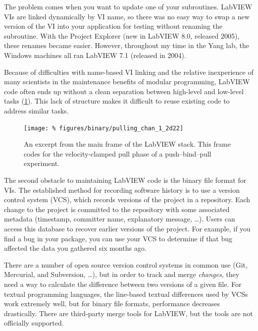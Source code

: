 
The problem comes when you want to update one of your subroutines.
LabVIEW VIs are linked dynamically by VI name\citep{ni-vi-management},
so there was no easy way to swap a new version of the VI into your
application for testing without renaming the subroutine.  With the
Project Explorer (new in LabVIEW 8.0\citep{ni-vi-management}, released
2005), these renames became easier.  However, throughout my time in
the Yang lab, the Windows machines all ran LabVIEW 7.1 (released in
2004).

Because of difficulties with name-based VI linking and the relative
inexperience of many scientists in the maintenance benefits of modular
programming\citep{hilburn93,wilson06b}, LabVIEW code often ends up
without a clean separation between high-level and low-level tasks
(\cref{fig:labview}).  This lack of structure makes it difficult to
reuse existing code to address similar tasks.

\begin{figure}
  \begin{center}
    \texttt{[image: \%
      figures/binary/pulling\_chan\_1\_2d22]}
    \caption{An excerpt from the main frame of the LabVIEW stack.
      This frame codes for the velocity-clamped pull phase of a
      push--bind--pull experiment.\label{fig:labview}}
  \end{center}
\end{figure}

The second obstacle to maintaining LabVIEW code is the binary file
format for VIs.  The established method for recording software history
is to use a version control system (VCS), which records versions of
the project in a repository.  Each change to the project is committed
to the repository with some associated metadata (timestamp, committer
name, explanatory message, \ldots).  Users can access this database to
recover earlier versions of the project.  For example, if you find a
bug in your package, you can use your VCS to determine if that bug
affected the data you gathered six months ago.

There are a number of open source version control systems in common
use (Git, Mercurial, and Subversion, \dots), but in order to track and
merge \emph{changes}, they need a way to calculate the difference
between two versions of a given file.  For textual programming
languages, the line-based textual differences used by VCSs work
extremely well, but for binary file formats, performance decreases
drastically.  There are third-party merge tools\citep{ni-merge} for
LabVIEW, but the tools are not officially supported.
%

